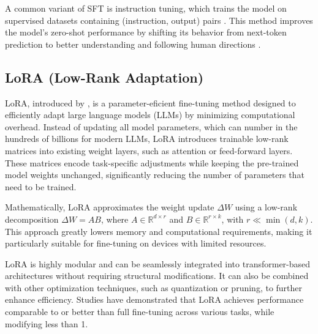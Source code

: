 A common variant of SFT is instruction tuning, which trains the model on supervised datasets containing (instruction, output) pairs \citep{Wei2022FinetunedLMZeroShot}. This method improves the model’s zero-shot performance by shifting its behavior from next-token prediction to better understanding and following human directions \citep{Zhang2024InstructionTuningLLM}. 




\subsection{LoRA (Low-Rank Adaptation)}     %


LoRA, introduced by \cite{Hu2021LoRA}, is a parameter-eficient fine-tuning method designed to efficiently adapt large language models (LLMs) by minimizing computational overhead. Instead of updating all model parameters, which can number in the hundreds of billions for modern LLMs, LoRA introduces trainable low-rank matrices into existing weight layers, such as attention or feed-forward layers. These matrices encode task-specific adjustments while keeping the pre-trained model weights unchanged, significantly reducing the number of parameters that need to be trained.

Mathematically, LoRA approximates the weight update $\Delta W$ using a low-rank decomposition $\Delta W = A B$, where $A \in \mathbb{R}^{d \times r}$ and $B \in \mathbb{R}^{r \times k}$, with $r \ll \min(d,k)$. This approach greatly lowers memory and computational requirements, making it particularly suitable for fine-tuning on devices with limited resources.

LoRA is highly modular and can be seamlessly integrated into transformer-based architectures without requiring structural modifications. It can also be combined with other optimization techniques, such as quantization or pruning, to further enhance efficiency. Studies have demonstrated that LoRA achieves performance comparable to or better than full fine-tuning across various tasks, while modifying less than 1.%

